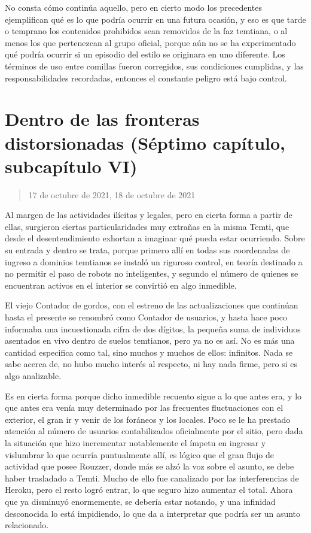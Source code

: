\documentclass[
  spanish,
]{book}
\begin{document}
No consta cómo continúa aquello, pero en cierto modo los precedentes ejemplifican qué es lo que podría ocurrir en una futura ocasión, y eso es que tarde o temprano los contenidos prohibidos sean removidos de la faz temtiana, o al menos los que pertenezcan al grupo oficial, porque aún no se ha experimentado qué podría ocurrir si un episodio del estilo se originara en uno diferente. Los términos de uso entre comillas fueron corregidos, sus condiciones cumplidas, y las responsabilidades recordadas, entonces el constante peligro está bajo control.

\hypertarget{dentro-de-las-fronteras-distorsionadas-suxe9ptimo-capuxedtulo-subcapuxedtulo-vi}{%
\section{Dentro de las fronteras distorsionadas (Séptimo capítulo, subcapítulo VI)}\label{dentro-de-las-fronteras-distorsionadas-suxe9ptimo-capuxedtulo-subcapuxedtulo-vi}}

\begin{quote}
17 de octubre de 2021, 18 de octubre de 2021
\end{quote}

Al margen de las actividades ilícitas y legales, pero en cierta forma a partir de ellas, surgieron ciertas particularidades muy extrañas en la misma Temti, que desde el desentendimiento exhortan a imaginar qué pueda estar ocurriendo. Sobre su entrada y dentro se trata, porque primero allí en todas sus coordenadas de ingreso a dominios temtianos se instaló un riguroso control, en teoría destinado a no permitir el paso de robots no inteligentes, y segundo el número de quienes se encuentran activos en el interior se convirtió en algo inmedible.

El viejo Contador de gordos, con el estreno de las actualizaciones que continúan hasta el presente se renombró como Contador de usuarios, y hasta hace poco informaba una incuestionada cifra de dos dígitos, la pequeña suma de individuos asentados en vivo dentro de suelos temtianos, pero ya no es así. No es más una cantidad especifica como tal, sino muchos y muchos de ellos: infinitos. Nada se sabe acerca de, no hubo mucho interés al respecto, ni hay nada firme, pero si es algo analizable.

Es en cierta forma porque dicho inmedible recuento sigue a lo que antes era, y lo que antes era venía muy determinado por las frecuentes fluctuaciones con el exterior, el gran ir y venir de los foráneos y los locales. Poco se le ha prestado atención al número de usuarios contabilizados oficialmente por el sitio, pero dada la situación que hizo incrementar notablemente el ímpetu en ingresar y vislumbrar lo que ocurría puntualmente allí, es lógico que el gran flujo de actividad que posee Rouzzer, donde más se alzó la voz sobre el asunto, se debe haber trasladado a Temti. Mucho de ello fue canalizado por las interferencias de Heroku, pero el resto logró entrar, lo que seguro hizo aumentar el total. Ahora que ya disminuyó enormemente, se debería estar notando, y una infinidad desconocida lo está impidiendo, lo que da a interpretar que podría ser un asunto relacionado.
\end{document}
